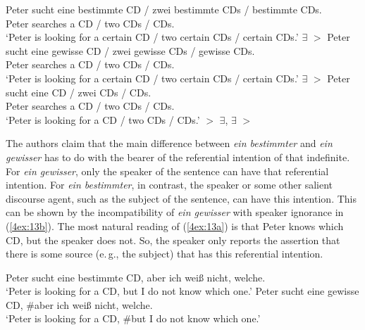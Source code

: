 \documentclass[output=paper]{langsci/langscibook}
\begin{document}
{\small{
\begin{exe}
\ex\label{4ex:12}
	\begin{xlista}
	\ex\label{4ex:12a}
	Peter sucht eine bestimmte CD / zwei bestimmte CDs / bestimmte CDs. \\
	Peter searches a {} CD / two {} CDs / {} CDs. \\
 	`Peter is looking for a certain CD / two certain CDs / certain CDs.'	
	\exi{} \hfill$\exists$ $>$ {}	
	\ex\label{4ex:12b}
	Peter sucht eine gewisse CD / zwei gewisse CDs / gewisse CDs. \\
	Peter searches a {} CD / two {} CDs / {} CDs. \\
 	`Peter is looking for a certain CD / two certain CDs / certain CDs.'
	\exi{} \hfill$\exists$ $>$ {}
	\ex\label{4ex:12c}
	Peter sucht eine CD / zwei CDs / CDs. \\
	Peter searches a CD / two CDs / CDs. \\
	`Peter is looking for a CD / two CDs / CDs.' %
	\hfill{} $>$ $\exists$, $\exists$ $>$ {}			
	\end{xlista}
\end{exe}
}}

The authors claim that the main difference between {\emph{ein bestimmter}} and {\emph{ein gewisser}} has to do with the bearer of the referential intention of that indefinite. For {\emph{ein gewisser}}, only the speaker of the sentence can have that referential intention. For {\emph{ein bestimmter}}, in contrast, the speaker or some other salient discourse agent, such as the subject of the sentence, can have this intention. This can be shown by the incompatibility of {\emph{ein gewisser}} with speaker ignorance in (\ref{4ex:13b}). The most natural reading of (\ref{4ex:13a}) is that Peter knows which CD, but the speaker does not. So, the speaker only reports the assertion that there is some source (e.\,g., the subject) that has this referential intention.

\begin{exe}
\ex\label{4ex:13}
	\begin{xlista}
	\ex\label{4ex:13a}
	Peter sucht eine bestimmte CD, aber ich weiß nicht, welche. \\
	`Peter is looking for a {} CD, but I do not know which one.'
	\ex\label{4ex:13b}
	Peter sucht eine gewisse CD, \#aber ich weiß nicht, welche. \\
	`Peter is looking for a {} CD, \#but I do not know which one.'
	\end{xlista}
\end{exe}
\end{document}

